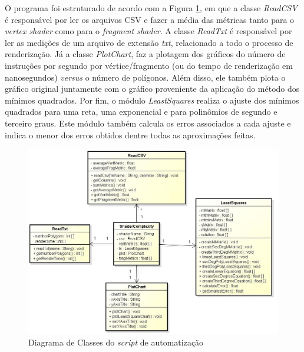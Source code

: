 	O programa foi estruturado de acordo com a Figura \ref{minquad_diag}, em que a classe \textit{ReadCSV} é responsável por ler os arquivos CSV e fazer a média das métricas tanto para o \textit{vertex shader} como para o \textit{fragment shader}. A classe \textit{ReadTxt} é responsável por ler as medições de um arquivo de extensão \textit{txt}, relacionado a todo o processo de renderização. Já a classe \textit{PlotChart}, faz a plotagem dos gráficos do número de instruções por segundo por vértice/fragmento (ou do tempo de renderização em nanosegundos) \textit{versus} o número de polígonos. Além disso, ele também plota o gráfico original juntamente com o gráfico proveniente da aplicação do método dos mínimos quadrados. Por fim, o módulo \textit{LeastSquares} realiza o ajuste dos mínimos quadrados para uma reta, uma exponencial e para polinômios de segundo e terceiro graus. Este módulo também calcula os erros associados a cada ajuste e indica o menor dos erros obtidos dentre todas as aproximações feitas. 

	\begin{figure}[ht]
	\centering
		\includegraphics[keepaspectratio=true,scale=0.58]{figuras/minquad_diag.jpg}
	\caption{Diagrama de Classes do \textit{script} de automatização}
	\label{minquad_diag}
	\end{figure}

